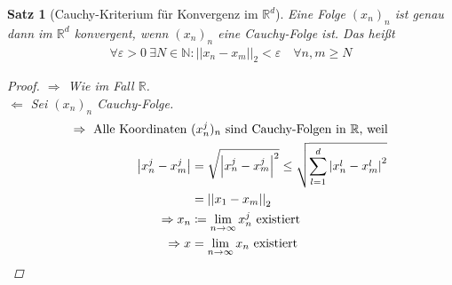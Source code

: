 \documentclass[11pt, twoside, a4paper]{article}
\theoremstyle{plain}
\newtheorem{satz}[blockelement]{Satz}
\newcommand{\abs}[1]{\left|#1\right|}
\newcommand{\norm}[1]{\abs{\abs{#1}}}
\newcommand{\impl}[0]{\Rightarrow{}}
\newcommand{\definedas}[0]{\coloneqq}
\newcommand{\anf}[1]{\glqq{}#1\grqq}
\newcommand{\fromto}{\rightarrow{}}
\newcommand{\ntoinfty}[0]{n\fromto\infty}
\newcommand{\R}{\mathbb{R}}
\newcommand{\N}{\mathbb{N}}
\begin{document}
    \begin{satz}[Cauchy-Kriterium für Konvergenz im $\R^d$]
        Eine Folge $(x_n)_n$ ist genau dann im $\R^d$ konvergent, wenn $(x_n)_n$ eine Cauchy-Folge ist. Das heißt
        \begin{align*}
            \forall\varepsilon > 0~\exists N\in\N\colon \norm{x_n-x_m}_2 < \varepsilon\quad\forall n,m\geq N
        \end{align*}

        \begin{proof}
            \anf{$\impl$} Wie im Fall $\R$.\\
            \anf{$\Leftarrow$} Sei $(x_n)_n$ Cauchy-Folge.
            \begin{align*}
                \impl\text{ Alle Koordinaten } &(x_n^j)_n\text{ sind Cauchy-Folgen in }\R\text{, weil}\\
                \abs{x_n^j-x_m^j} &= \sqrt {\abs{x_n^j-x_m^j}^2} \leq \sqrt {\sum_{l=1}^{d} \abs{x_n^l - x_m^l}^2}\\
                &= \norm{x_1-x_m}_2\\
                \impl x_n &\definedas \lim_{\ntoinfty} x_n^j\text{ existiert}\\
                \impl x &= \lim_{\ntoinfty} x_n\text{ existiert}\qedhere
            \end{align*}
        \end{proof}


\end{satz}
\end{document}
